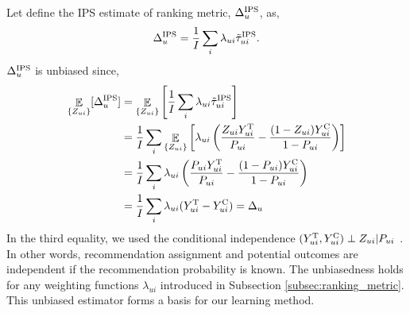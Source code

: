 \documentclass[manuscript,screen]{acmart}
\DeclareMathOperator{\E}{\mathbb{E}}
\begin{document}
Let define the IPS estimate of ranking metric, $\Delta_{u}^{\textnormal{IPS}}$, as,
\begin{equation}
\Delta_{u}^{\textnormal{IPS}} = \frac{1}{I} \sum_i \lambda_{ui} \tilde{\tau}_{ui}^{\textnormal{IPS}}.
\end{equation}
$\Delta_{u}^{\textnormal{IPS}}$ is unbiased since,
\begin{align} 
\label{eq:e_delta_u_IPS}
\E_{\{Z_{ui}\}} [\Delta_{u}^{\textnormal{IPS}}]
&= \E_{\{Z_{ui}\}} \left[ \frac{1}{I} \sum_i \lambda_{ui} \tilde{\tau}_{ui}^{\textnormal{IPS}} \right] \nonumber\\
&= \frac{1}{I} \sum_i \E_{\{Z_{ui}\}} \left[ \lambda_{ui} \left(\frac{Z_{ui} Y_{ui}^\textnormal{T}}{P_{ui}} - \frac{(1-Z_{ui}) Y_{ui}^\textnormal{C}}{1-P_{ui}} \right)\right]\nonumber\\
&= \frac{1}{I} \sum_i \lambda_{ui} \left(\frac{P_{ui} Y_{ui}^\textnormal{T}}{P_{ui}} - \frac{(1-P_{ui}) Y_{ui}^\textnormal{C}}{1-P_{ui}} \right) \nonumber\\
&= \frac{1}{I} \sum_i \lambda_{ui} (Y_{ui}^\textnormal{T} - Y_{ui}^\textnormal{C}) = \Delta_{u}
\end{align}
In the third equality, we used the conditional independence $(Y_{ui}^\textnormal{T}, Y_{ui}^\textnormal{C}) \perp Z_{ui} | P_{ui}$ \cite{Lunceford04} .
In other words, recommendation assignment and potential outcomes are independent if the recommendation probability is known.
The unbiasedness holds for any weighting functions $\lambda_{ui}$ introduced in Subsection \ref{subsec:ranking_metric}.
This unbiased estimator forms a basis for our learning method.
\end{document}
